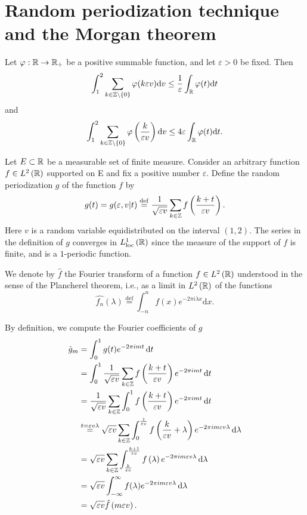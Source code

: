 \section{Random periodization technique and the Morgan theorem}
\begin{lemma}
  Let $\varphi:\mathbb{R}\to \mathbb{R}_{+}$ be a positive summable function, and let $\varepsilon >0$ be fixed. Then 
  \[
    \int_1^{2}\sum_{k\in \mathbb{Z}\backslash \{0\} }^{} \varphi(k\varepsilon v)\mathrm{d}v\le  \frac{1}{\varepsilon }\int_{\mathbb{R}}\varphi(t)\mathrm{d}t
  \] 
  and \[
    \int_1^{2}\sum_{k\in \mathbb{Z}\backslash \{0\} }^{} \varphi\left( \frac{k}{\varepsilon v} \right) \mathrm{d}v\le 4\varepsilon \int_{\mathbb{R}}\varphi(t)\mathrm{d}t.
  \] 
\end{lemma}
\begin{definition}
Let $E\subset \mathbb{R}$ be a measurable set of finite measure. Consider an arbitrary function $f\in L^{2}\left( \mathbb{R} \right) $ supported on E and fix a positive number $\varepsilon $. Define the random periodization $g$ of the function $f$ by
\[
  g(t)=g(\varepsilon ,v\lvert t)\overset{\mathrm{def}}{=} \frac{1}{\sqrt{\varepsilon v} }\sum_{k\in \mathbb{Z}}^{} f\left( \frac{k+t}{\varepsilon v} \right) .
\] 
Here $v$ is a random variable equidistributed on the interval $(1,2)$. The series in the definition of $g$ converges in $L^1_{\mathrm{loc}}\left( \mathbb{R} \right) $ since the measure of the support of $f$ is finite, and is a $1$-periodic function. 
\end{definition}
\begin{definition}
  We denote by $\hat{f}$ the Fourier transform of a function $f\in L^2\left( \mathbb{R} \right) $ understood in the sense of the Plancherel theorem, i.e., as a limit in $L^2\left( \mathbb{R} \right) $ of the functions
  \[
    \hat{f_n}(\lambda)\overset{\mathrm{def}}{=}\int_{-n}^{n}f(x)e^{-2\pi i \lambda x}\mathrm{d}x.
  \] 
\end{definition}
By definition, we compute the Fourier coefficients of $g$
\begin{align*}
  \hat{g}_m &= \int_0^{1}g(t)e^{-2\pi i mt}\,\mathrm{d}t\\
  &= \int_0^{1}\frac{1}{\sqrt{\varepsilon v} }\sum_{k\in \mathbb{Z}}^{} f\left( \frac{k+t}{\varepsilon v} \right) e^{-2\pi imt}\,\mathrm{d}t\\
  &= \frac{1}{\sqrt{\varepsilon v} }\sum_{k\in \mathbb{Z}}^{} \int_0^{1}f\left( \frac{k+t}{\varepsilon v} \right) e^{-2\pi i mt}\,\mathrm{d}t\\
  &\overset{t=\varepsilon v\lambda}{=}\sqrt{\varepsilon v}  \sum_{k\in \mathbb{Z}}^{} \int_0^{\frac{1}{\varepsilon v}}f\left( \frac{k}{\varepsilon v}+\lambda \right) e^{-2\pi im\varepsilon v\lambda}\,\mathrm{d}\lambda\\
  &=\sqrt{\varepsilon v} \sum_{k\in \mathbb{Z}}^{} \int_{\frac{k}{\varepsilon v}}^{\frac{k+1}{\varepsilon v}}f\left( \lambda \right) e^{-2\pi im\varepsilon v \lambda}\,\mathrm{d}\lambda\\
  &=\sqrt{\varepsilon v} \int_{-\infty}^{\infty}f(\lambda)e^{-2\pi im\varepsilon v\lambda}\,\mathrm{d}\lambda\\
  &=\sqrt{\varepsilon v} \hat{f}\left( m\varepsilon v \right) 
.\end{align*}
